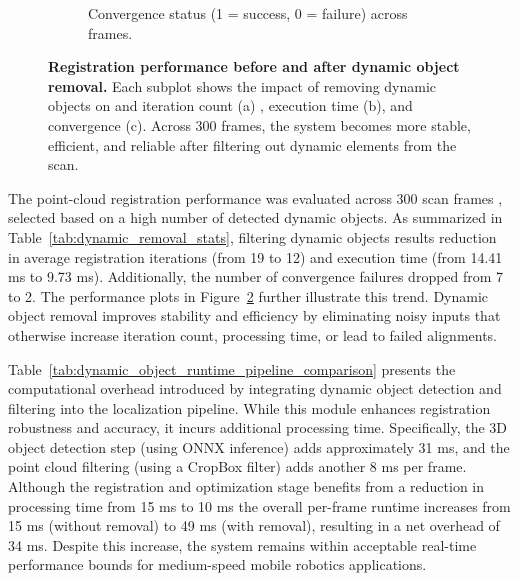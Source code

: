 \begin{figure}[H]
\begin{subfigure}[t]{0.45\textwidth}
		 \caption{Convergence status (1 = success, 0 = failure) across frames.}
		\label{fig:reg_converge}
	\end{subfigure}
	\caption[Point-cloud Registration Performance with and without Dynamic Object Removal]{\textbf{Registration performance before and after dynamic object removal.} Each subplot shows the impact of removing dynamic objects on and iteration count (a) , execution time (b), and convergence (c). Across 300 frames, the system becomes more stable, efficient, and reliable after filtering out dynamic elements from the scan.}
	\label{fig:registration_metrics_comparison}
\end{figure}


The point-cloud registration performance was evaluated across 300 scan frames , selected based on a high number of detected dynamic objects. As summarized in Table~\ref{tab:dynamic_removal_stats}, filtering dynamic objects results  reduction in average registration iterations (from 19 to 12) and execution time (from 14.41 ms to 9.73 ms). Additionally, the number of convergence failures dropped from 7 to 2. The performance plots in Figure~\ref{fig:registration_metrics_comparison} further illustrate this trend. Dynamic object removal improves stability and efficiency by eliminating noisy inputs that otherwise increase iteration count, processing time, or lead to failed alignments.


Table~\ref{tab:dynamic_object_runtime_pipeline_comparison} presents the computational overhead introduced by integrating dynamic object detection and filtering into the localization pipeline. While this module enhances registration robustness and accuracy, it incurs additional processing time. Specifically, the 3D object detection step (using ONNX inference) adds approximately 31 ms, and the point cloud filtering (using a CropBox filter) adds another 8 ms per frame. Although the registration and optimization stage benefits from a reduction in processing time from 15 ms to 10 ms the overall per-frame runtime increases from 15 ms (without removal) to 49 ms (with removal), resulting in a net overhead of 34 ms. Despite this increase, the system remains within acceptable real-time performance bounds for medium-speed mobile robotics applications.


